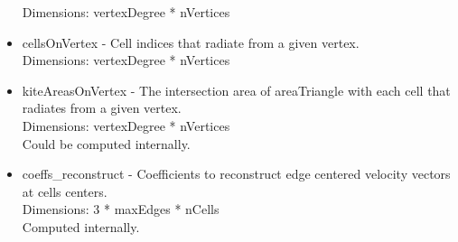 \documentclass[11pt]{report}
\begin{document}
\begin{itemize}
		  Dimensions: vertexDegree * nVertices
	\item cellsOnVertex - Cell indices that radiate from a given vertex. \\
		  Dimensions: vertexDegree * nVertices
	\item kiteAreasOnVertex - The intersection area of areaTriangle with each cell that radiates from a given vertex. \\
		  Dimensions: vertexDegree * nVertices \\
		  Could be computed internally. 
	\item coeffs\_reconstruct - Coefficients to reconstruct edge centered velocity vectors at cells centers. \\
		  Dimensions: 3 * maxEdges * nCells \\
		  Computed internally. 
\end{itemize}
\end{document}
